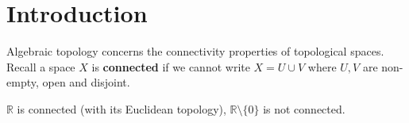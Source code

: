 \documentclass{article}
\begin{document}
\maketitle

\tableofcontents

\clearpage
\section{Introduction}
Algebraic topology concerns the connectivity properties of topological spaces.
Recall a space $X$ is \textbf{connected} if we cannot write $X = U \cup V$ where $U,V$ are non-empty, open and disjoint.
\begin{eg}
  $\mathbb{R}$ is connected (with its Euclidean topology), $\mathbb{R} \setminus \{0\}$ is not connected.
\end{eg}
\end{document}
